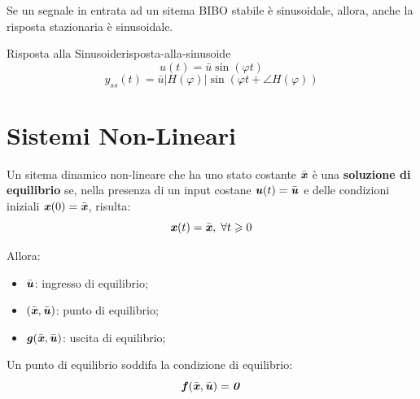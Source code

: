\documentclass[12pt]{article}
\begin{document}
Se un segnale in entrata ad un sitema BIBO stabile \`e sinusoidale, allora, anche la risposta stazionaria \`e sinusoidale.
\begin{theorem}{Risposta alla Sinusoide}{risposta-alla-sinusoide}
    \[ u(t) = \bar{u}\sin(\varphi t) \]
    \[ y _{ss}(t) = \bar{u}|H(\varphi)| \sin(\varphi t + \angle H(\varphi)) \]
\end{theorem}


\section{Sistemi Non-Lineari}
Un sitema dinamico non-lineare che ha uno stato costante $\bar{\textbf{\textit{x}}}$ \`e una \textbf{soluzione di equilibrio} se, nella presenza di un input costane $\textbf{\textit{u}}(t) = \bar{\textbf{\textit{u}}}$ e delle condizioni iniziali $\textbf{\textit{x}}(0) = \bar{\textbf{\textit{x}}}$, risulta:
\[ \textbf{\textit{x}}(t) = \bar{\textbf{\textit{x}}}, \;\forall t \geqslant 0 \]

Allora:
\begin{itemize}
    \item $\bar{\textbf{\textit{u}}}$: ingresso di equilibrio;
    \item $(\bar{\textbf{\textit{x}}},\bar{\textbf{\textit{u}}})$: punto di equilibrio;
    \item $\textbf{\textit{g}}(\bar{\textbf{\textit{x}}},\bar{\textbf{\textit{u}}})$: uscita di equilibrio;
\end{itemize}

Un punto di equilibrio soddifa la condizione di equilibrio:
\[ \textbf{\textit{f}}(\bar{\textbf{\textit{x}}},\bar{\textbf{\textit{u}}}) = \textbf{\textit{0}} \]
\end{document}
